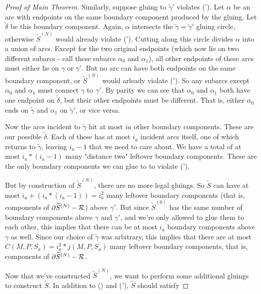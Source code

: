 \begin{proof}[Proof of Main Theorem]
Similarly, suppose gluing to $\widetilde{\gamma}'$ violates (\dag'). Let $\alpha$ be an
arc with endpoints on the same boundary component produced by the gluing. Let
$\widetilde{\delta}$ be this boundary component. Again, $\alpha$ intersects the
$\widetilde{\gamma} = \widetilde{\gamma}'$ gluing circle, otherwise $\widetilde{S}^{(N)}$ would already
violate (\dag').  Cutting along this circle divides $\alpha$ into a union of
arcs.  Except for the two original endpoints (which now lie on two different
subarcs - call these subarcs $\alpha_0$ and $\alpha_1$), all other endpoints of
these arcs must either lie on $\gamma$ or $\gamma'$.  But no arc can have both
endpoints on the same boundary component, or $\widetilde{S}^{(N)}$ would arleady violate
(\dag'). So any subarcs except $\alpha_0$ and $\alpha_1$ must connect $\gamma$ to
$\gamma'$.  By parity we can see that $\alpha_0$ and $\alpha_1$ both have one
endpoint on $\widetilde{\delta}$, but their other endpoints must be different. That is,
either $\alpha_0$ ends on $\widetilde{\gamma}$ and $\alpha_1$ on $\widetilde{\gamma}'$, or vice
versa.

Now the arcs incident to $\widetilde{\gamma}$ hit at most $ia$ other boundary
components. These are our possible $\widetilde{\delta}$. Each of these has at
most $i_a$ incident arcs itself, one of which returns to $\widetilde{\gamma}$,
leaving $i_a-1$ that we need to care about. We have a total of at most
$i_a*(i_a-1)$ many "distance two" leftover boundary components. These are the
only boundary components we can glue to to violate (\dag').

But by construction of $\widetilde{S}^{(N)}$, there are no more legal gluings. So
$\widetilde{S}$ can have at most $i_a+(i_a*(i_a-1)) = i_a^2$ many leftover boundary
components (that is, components of $\partial\widetilde{S}^{(N)}-\mathcal{R}$) above $\gamma'$.  But since
$\widetilde{S}^{(0)}$ has the same number of boundary components above $\gamma$ and
$\gamma'$, and we're only allowed to glue them to each other, this implies that
there can be at most $i_a$ boundary components above $\gamma$ as well.  Since
our choice of $\widetilde{\gamma}$ was arbitrary, this implies that there are
at most $C(M,P,S_a) = i_a^2*j(M,P,S_a)$ many leftover boundary components, that
is, components of $\partial\widetilde{S}^{(N)}-\mathcal{R}$.


Now that we've constructed $\widetilde{S}^{(N)}$, we want to perform some additional
gluings to construct $\widetilde{S}$. In addition to (\dag) and (\dag'), $\widetilde{S}$ should
satisfy


\end{proof}
